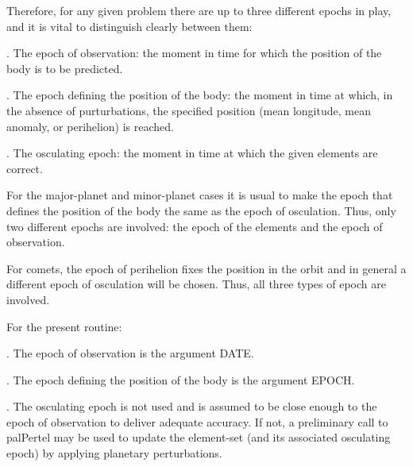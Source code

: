 \documentclass[twoside,11pt,nolof]{starlink}
\begin{document}
{{{      }
        Therefore, for any given problem there are up to three different
        epochs in play, and it is vital to distinguish clearly between
        them:

        . The epoch of observation:  the moment in time for which the
          position of the body is to be predicted.

        . The epoch defining the position of the body:  the moment in time
          at which, in the absence of purturbations, the specified
          position (mean longitude, mean anomaly, or perihelion) is
          reached.

        . The osculating epoch:  the moment in time at which the given
          elements are correct.

        For the major-planet and minor-planet cases it is usual to make
        the epoch that defines the position of the body the same as the
        epoch of osculation.  Thus, only two different epochs are
        involved:  the epoch of the elements and the epoch of observation.

        For comets, the epoch of perihelion fixes the position in the
        orbit and in general a different epoch of osculation will be
        chosen.  Thus, all three types of epoch are involved.

        For the present routine:

        . The epoch of observation is the argument DATE.

        . The epoch defining the position of the body is the argument
          EPOCH.

        . The osculating epoch is not used and is assumed to be close
          enough to the epoch of observation to deliver adequate accuracy.
          If not, a preliminary call to palPertel may be used to update
          the element-set (and its associated osculating epoch) by
          applying planetary perturbations.
   }
}
\end{document}
